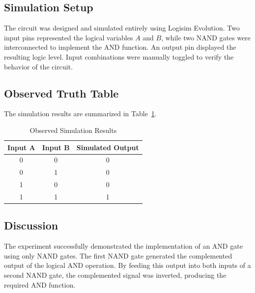 \documentclass[12pt,a4paper]{article}
\begin{document}

\subsection{Simulation Setup}

The circuit was designed and simulated entirely using Logisim Evolution. Two input pins represented the logical variables $A$ and $B$, while two NAND gates were interconnected to implement the AND function. An output pin displayed the resulting logic level. Input combinations were manually toggled to verify the behavior of the circuit.


\subsection{Observed Truth Table}

The simulation results are summarized in Table~\ref{tab:and_observed}.

\begin{table}[H]
\centering
\caption{Observed Simulation Results}
\label{tab:and_observed}
\begin{tabular}{|c|c|c|}
\hline
Input A & Input B & Simulated Output\\
\hline
0 & 0 & 0\\
\hline
0 & 1 & 0\\
\hline
1 & 0 & 0\\
\hline
1 & 1 & 1\\
\hline
\end{tabular}
\end{table}





\subsection{Discussion}

The experiment successfully demonstrated the implementation of an AND gate using only NAND gates. The first NAND gate generated the complemented output of the logical AND operation. By feeding this output into both inputs of a second NAND gate, the complemented signal was inverted, producing the required AND function.
\end{document}
